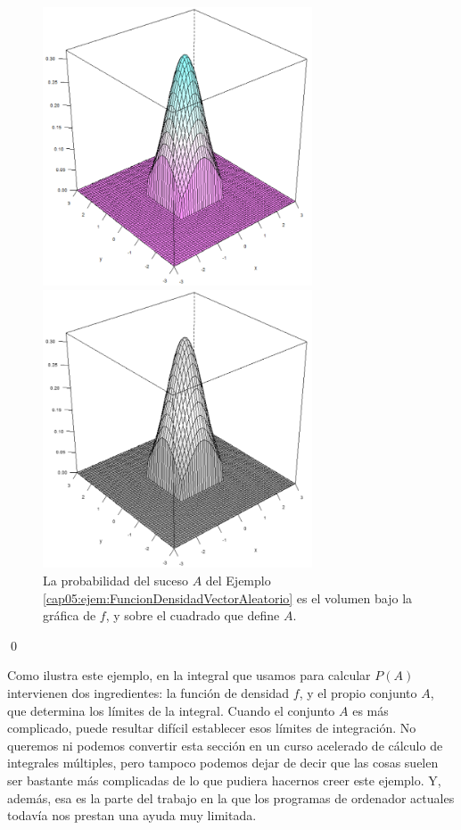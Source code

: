 \begin{ejemplo}
  \begin{figure}[thb]
	\begin{center}
	\begin{enColor}
    \includegraphics[width=8cm]{../fig/Cap05-RegionIntegracionEjemploDensidadVectorAleatorio2.png}
	\end{enColor}
	\begin{bn}
    \includegraphics[width=8cm]{../fig/Cap05-RegionIntegracionEjemploDensidadVectorAleatorio2-bn.png}
	\end{bn}
	\caption{La probabilidad del suceso $A$ del Ejemplo \ref{cap05:ejem:FuncionDensidadVectorAleatorio} es
    el volumen bajo la gráfica de $f$, y sobre el cuadrado que define $A$.}
	\label{cap01:fig:RegionIntegracionEjemploDensidadVectorAleatorio2}
    \end{center}
  \end{figure}
\qed
\end{ejemplo}
Como ilustra este ejemplo, en la integral que usamos para calcular $P(A)$ intervienen dos ingredientes: la función de densidad $f$, y el propio conjunto $A$, que determina los límites de la integral. Cuando el conjunto $A$ es más complicado, puede resultar difícil  establecer esos límites de integración. No queremos ni podemos convertir esta sección en un curso acelerado de cálculo de integrales múltiples, pero tampoco podemos dejar de decir que las cosas suelen ser bastante más complicadas de lo que pudiera hacernos creer este ejemplo. Y, además, esa es la parte del trabajo en la que los programas de ordenador actuales todavía nos prestan una ayuda muy limitada.

